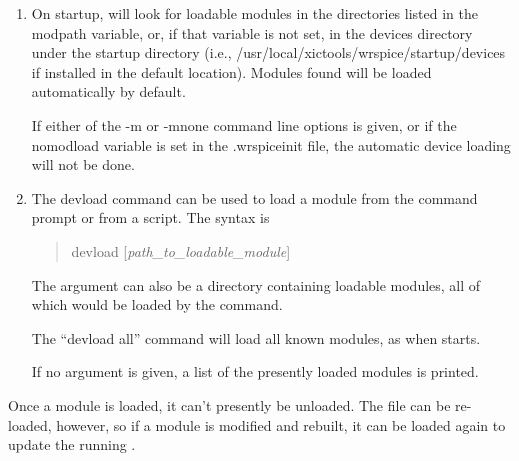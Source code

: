 \begin{enumerate}
\item{On startup, {\WRspice} will look for loadable modules in the
directories listed in the {\vt modpath} variable, or, if that variable
is not set, in the {\vt devices} directory under the {\vt startup}
directory (i.e., {\vt /usr/local/xictools/wrspice/startup/devices} if
installed in the default location).  Modules found will be loaded
automatically by default.

If either of the {\vt -m} or {\vt -mnone} command line options is
given, or if the {\vt nomodload} variable is set in the {\vt
.wrspiceinit} file, the automatic device loading will not be done.}

\item{The {\cb devload} command can be used to load a module from the
command prompt or from a script.  The syntax is
\begin{quote}
{\vt devload} [{\it path\_to\_loadable\_module\/}]
\end{quote}

The argument can also be a directory containing loadable modules, all
of which would be loaded by the command.

The ``{\vt devload all}'' command will load all known modules, as when
{\WRspice} starts.

If no argument is given, a list of the presently loaded modules
is printed. }
\end{enumerate}

Once a module is loaded, it can't presently be unloaded.  The file can
be re-loaded, however, so if a module is modified and rebuilt, it can
be loaded again to update the running {\WRspice}.


